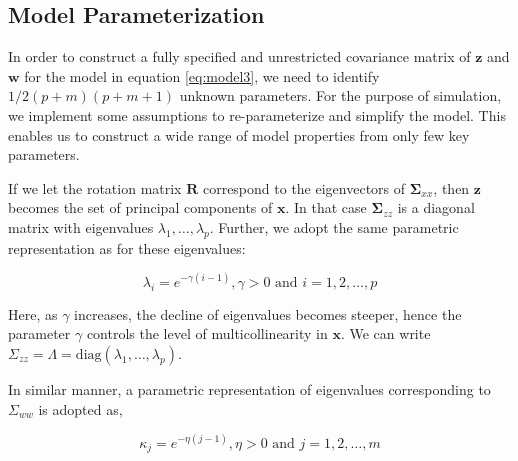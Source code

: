 \documentclass[review]{elsarticle}
\providecommand{\tightlist}{%
  \setlength{\itemsep}{0pt}\setlength{\parskip}{0pt}}
\theoremstyle{definition}
\theoremstyle{definition}
\theoremstyle{definition}
\theoremstyle{remark}
\begin{document}
\subsection{Model Parameterization}\label{model-parameterization}

In order to construct a fully specified and unrestricted covariance
matrix of \(\mathbf{z}\) and \(\mathbf{w}\) for the model in equation
\eqref{eq:model3}, we need to identify \(1/2 (p+m)(p+m+1)\) unknown
parameters. For the purpose of simulation, we implement some assumptions
to re-parameterize and simplify the model. This enables us to construct
a wide range of model properties from only few key parameters.

\begin{description}
\tightlist
\item[\textbf{Parameterization of \(\boldsymbol{\Sigma}_{zz}\)}]
If we let the rotation matrix \(\mathbf{R}\) correspond to the
eigenvectors of \(\boldsymbol{\Sigma}_{xx}\), then \(\mathbf{z}\)
becomes the set of principal components of \(\mathbf{x}\). In that case
\(\boldsymbol{\Sigma}_{zz}\) is a diagonal matrix with eigenvalues
\(\lambda_1, \ldots, \lambda_p\). Further, we adopt the same parametric
representation as \citet{saebo2015simrel} for these eigenvalues:

\begin{equation}
  \lambda_i = e^{-\gamma(i - 1)}, \gamma >0 \text{ and } i = 1, 2, \ldots, p
  \label{eq:gamma-parameter}
  \end{equation}

Here, as \(\gamma\) increases, the decline of eigenvalues becomes
steeper, hence the parameter \(\gamma\) controls the level of
multicollinearity in \(\mathbf{x}\). We can write
\(\Sigma_{zz} = \Lambda = \text{diag}(\lambda_1, \ldots, \lambda_p)\).
\item[\textbf{Parameterization of \(\boldsymbol{\Sigma}_{ww}\)}]
In similar manner, a parametric representation of eigenvalues
corresponding to \(\Sigma_{ww}\) is adopted as,

\begin{equation}
  \kappa_j = e^{-\eta(j - 1)}, \eta >0 \text{ and } j = 1, 2, \ldots, m
  \label{eq:eta-parameter}
  \end{equation}


\end{description}
\end{document}
